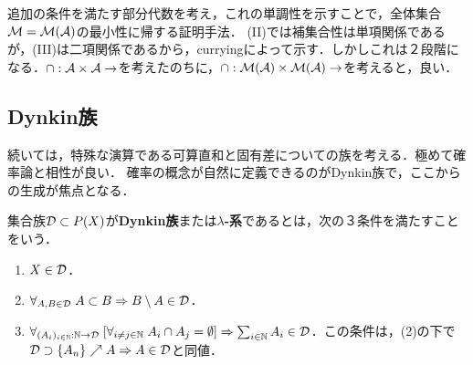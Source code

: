 \documentclass[uplatex, dvipdfmx]{jsreport}
\begin{document}
\begin{remarks}
    追加の条件を満たす部分代数を考え，これの単調性を示すことで，全体集合$\mathcal{M}=\mathcal{M}(\mathcal{A})$の最小性に帰する証明手法．
    (II)では補集合性は単項関係であるが，(III)は二項関係であるから，curryingによって示す．しかしこれは２段階になる．$\cap:\mathcal{A}\times\mathcal{A}\to$を考えたのちに，$\cap:\mathcal{M}(\mathcal{A})\times\mathcal{M}(\mathcal{A})\to$を考えると，良い．
\end{remarks}

\subsection{Dynkin族}

\begin{tcolorbox}[colframe=ForestGreen, colback=ForestGreen!10!white,breakable,colbacktitle=ForestGreen!40!white,coltitle=black,fonttitle=\bfseries\sffamily,
title=]
    続いては，特殊な演算である可算直和と固有差についての族を考える．極めて確率論と相性が良い．
    確率の概念が自然に定義できるのがDynkin族で，ここからの生成が焦点となる．
\end{tcolorbox}

\begin{definition}
    集合族$\mathcal{D}\subset P(X)$が\textbf{Dynkin族}または\textbf{$\lambda$-系}であるとは，次の３条件を満たすことをいう．
    \begin{enumerate}
        \item $X\in\mathcal{D}$．
        \item $\forall_{A,B\in\mathcal{D}}\;A\subset B\Rightarrow B\setminus A\in\mathcal{D}$．
        \item $\forall_{(A_i)_{i\in\mathbb{N}}:\mathbb{N}\to\mathcal{D}}\;[\forall_{i\ne j\in\mathbb{N}}\;A_i\cap A_j=\emptyset]\Rightarrow \sum_{i\in\mathbb{N}}A_i\in\mathcal{D}$．この条件は，(2)の下で$\mathcal{D}\supset\{A_n\}\nearrow A\Rightarrow A\in\mathcal{D}$と同値．
    \end{enumerate}
\end{definition}
\end{document}
